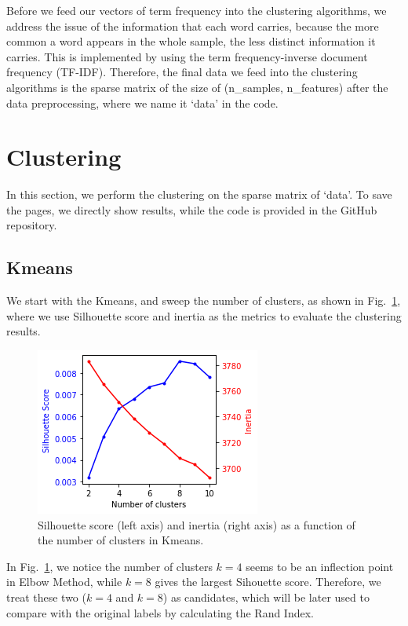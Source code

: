 \documentclass{article}
\begin{document}
    Before we feed our vectors of term frequency into the clustering algorithms, we address the issue of the information that each word carries, because the more common a word appears in the whole sample, the less distinct information it carries. This is implemented by using the term frequency-inverse document frequency (TF-IDF). Therefore, the final data we feed into the clustering algorithms is the sparse matrix of the size of (n\_samples, n\_features) after the data preprocessing, where we name it `data' in the code. 


    \section{Clustering}
    In this section, we perform the clustering on the sparse matrix of `data'. To save the pages, we directly show results, while the code is provided in the GitHub repository.~\cite{Github}
    \subsection{Kmeans}
    We start with the Kmeans, and sweep the number of clusters, as shown in Fig.~\ref{fig:kmeans}, where we use Silhouette score and inertia as the metrics to evaluate the clustering results.

    
    \begin{figure}[ht]
        \centering
        \includegraphics[width=.5\textwidth]{kmeans}
        \caption{Silhouette score (left axis) and inertia (right axis) as a function of the number of clusters in Kmeans.}
        \label{fig:kmeans}
    \end{figure}

    In Fig.~\ref{fig:kmeans}, we notice the number of clusters $k=4$ seems to be an inflection point in Elbow Method, while $k=8$ gives the largest Sihouette score. Therefore, we treat these two ($k=4$ and $k=8$) as candidates, which will be later used to compare with the original labels by calculating the Rand Index.
\end{document}
